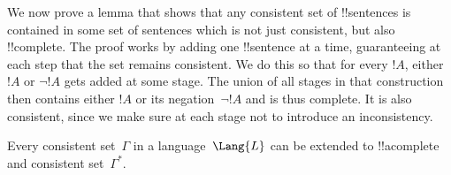 \documentclass[../../../include/open-logic-section]{subfiles}
\begin{document}
      {}
      {}

\begin{explain}
We now prove a lemma that shows that any consistent set of
!!{sentence}s is contained in some set of sentences which is not just
consistent, but also !!{complete}. The proof works by adding one
!!{sentence} at a time, guaranteeing at each step that the set remains
consistent. We do this so that for every $!A$, either $!A$ or $\lnot
!A$ gets added at some stage. The union of all stages in that
construction then contains either $!A$ or its negation~$\lnot !A$ and
is thus complete. It is also consistent, since we make sure at each
stage not to introduce an inconsistency.
\end{explain}

\begin{lem}
 Every consistent
set~$\Gamma$ in a language~$\Lang{L}$ can be
extended to !!a{complete} and consistent set~$\Gamma^*$.
\end{lem}
\end{document}
